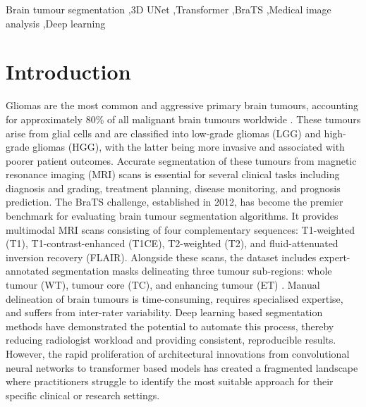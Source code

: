 \documentclass[a4paper,fleqn]{cas-sc}
\begin{document}
\begin{keywords}
Brain tumour segmentation \sep 3D UNet \sep Transformer \sep BraTS \sep Medical image analysis \sep Deep learning
\end{keywords}

\maketitle

\section{Introduction}
\label{sec:intro}

Gliomas are the most common and aggressive primary brain tumours, accounting for approximately 80\% of all malignant brain tumours worldwide \citep{bakas2017}. These tumours arise from glial cells and are classified into low-grade gliomas (LGG) and high-grade gliomas (HGG), with the latter being more invasive and associated with poorer patient outcomes. Accurate segmentation of these tumours from magnetic resonance imaging (MRI) scans is essential for several clinical tasks including diagnosis and grading, treatment planning, disease monitoring, and prognosis prediction. The BraTS challenge, established in 2012, has become the premier benchmark for evaluating brain tumour segmentation algorithms. It provides multimodal MRI scans consisting of four complementary sequences: T1-weighted (T1), T1-contrast-enhanced (T1CE), T2-weighted (T2), and fluid-attenuated inversion recovery (FLAIR). Alongside these scans, the dataset includes expert-annotated segmentation masks delineating three tumour sub-regions: whole tumour (WT), tumour core (TC), and enhancing tumour (ET) \citep{menze2015}. Manual delineation of brain tumours is time-consuming, requires specialised expertise, and suffers from inter-rater variability. Deep learning based segmentation methods have demonstrated the potential to automate this process, thereby reducing radiologist workload and providing consistent, reproducible results. However, the rapid proliferation of architectural innovations from convolutional neural networks to transformer based models has created a fragmented landscape where practitioners struggle to identify the most suitable approach for their specific clinical or research settings.
\end{document}
